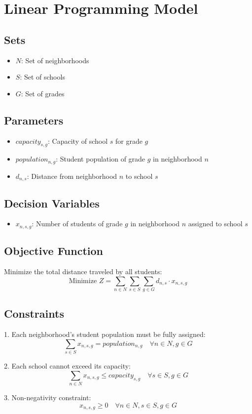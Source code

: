\documentclass{article}
\begin{document}
\section*{Linear Programming Model}

\subsection*{Sets}
\begin{itemize}
    \item $N$: Set of neighborhoods
    \item $S$: Set of schools
    \item $G$: Set of grades
\end{itemize}

\subsection*{Parameters}
\begin{itemize}
    \item $capacity_{s,g}$: Capacity of school $s$ for grade $g$
    \item $population_{n,g}$: Student population of grade $g$ in neighborhood $n$
    \item $d_{n,s}$: Distance from neighborhood $n$ to school $s$
\end{itemize}

\subsection*{Decision Variables}
\begin{itemize}
    \item $x_{n,s,g}$: Number of students of grade $g$ in neighborhood $n$ assigned to school $s$
\end{itemize}

\subsection*{Objective Function}
Minimize the total distance traveled by all students:
\[
\text{Minimize } Z = \sum_{n \in N} \sum_{s \in S} \sum_{g \in G} d_{n,s} \cdot x_{n,s,g}
\]

\subsection*{Constraints}
1. Each neighborhood's student population must be fully assigned:
\[
\sum_{s \in S} x_{n,s,g} = population_{n,g} \quad \forall n \in N, g \in G
\]

2. Each school cannot exceed its capacity:
\[
\sum_{n \in N} x_{n,s,g} \leq capacity_{s,g} \quad \forall s \in S, g \in G
\]

3. Non-negativity constraint:
\[
x_{n,s,g} \geq 0 \quad \forall n \in N, s \in S, g \in G
\]
\end{document}
